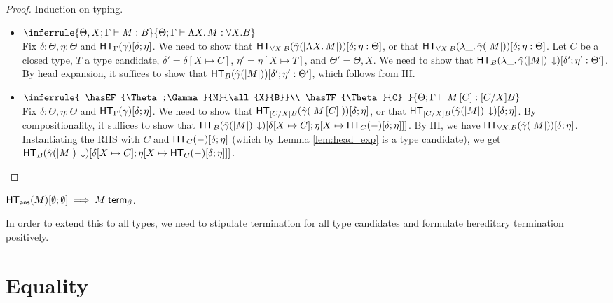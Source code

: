 \documentclass{article}
\begin{document}
\begin{proof}
Induction on typing.
\begin{itemize}
\setlength\itemsep{1em}
\item $\inferrule{
  \hasEF{\Theta, X; \Gamma}{M}{B}
  }{
  \hasEF{\Theta; \Gamma}{\tlam{X}{M}}{\all{X}{B}}
  }$\\
Fix $\delta : \Theta, \eta : \Theta$ and $\mathsf{HT}_{\Gamma}(\gamma)[\delta;\eta]$. We need to show that
$\mathsf{HT}_{\forall X. B}(\hat\gamma(|\Lambda X.\, M|))[\delta;\eta : \Theta]$, or that
$\mathsf{HT}_{\forall X. B}(\lambda \_.\, \hat\gamma(|M|))[\delta;\eta : \Theta]$.
Let $C$ be a closed type, $T$ a type candidate,
$\delta' = \delta[X \mapsto C]$, $\eta' = \eta[X \mapsto T]$, and $\Theta' = \Theta,X$.
We need to show that $\mathsf{HT}_{B}(\lambda \_.\, \hat\gamma(|M|)\,\downarrow)[\delta';\eta' : \Theta']$.
By head expansion, it suffices to show
that $\mathsf{HT}_{B}(\hat\gamma(|M|))[\delta';\eta' : \Theta']$, which follows from IH.

\item $\inferrule{
  \hasEF{\Theta;\Gamma}{M}{\all{X}{B}}\\
  \hasTF{\Theta}{C}
  }{
  \hasEF{\Theta;\Gamma}{\tap{M}{C}}{[C/X]B}
  }$\\
Fix $\delta : \Theta, \eta : \Theta$ and $\mathsf{HT}_{\Gamma}(\gamma)[\delta;\eta]$. We need to show that
$\mathsf{HT}_{[C/X]B}(\hat\gamma(|M\,[C]|))[\delta;\eta]$, or that
$\mathsf{HT}_{[C/X]B}(\hat\gamma(|M|)\,\downarrow)[\delta;\eta]$. By compositionality, it suffices to show that
$\mathsf{HT}_{B}(\hat\gamma(|M|)\,\downarrow)[\delta[X \mapsto C];\eta[X \mapsto \mathsf{HT}_{C}(-)[\delta;\eta]]]$.
By IH, we have $\mathsf{HT}_{\forall X. B}(\hat\gamma(|M|))[\delta;\eta]$. Instantiating the RHS with $C$ and
$\mathsf{HT}_{C}(-)[\delta;\eta]$ (which by Lemma \ref{lem:head_exp} is a type candidate), we get
$\mathsf{HT}_{B}(\hat\gamma(|M|)\,\downarrow)[\delta[X \mapsto C];\eta[X \mapsto \mathsf{HT}_{C}(-)[\delta;\eta]]]$.
\end{itemize}
\end{proof}

\begin{corollary}
$\mathsf{HT}_{\mathsf{ans}}(M)[\emptyset;\emptyset] \implies {M} \; \mathsf{term}_{\beta}$.
\end{corollary}

In order to extend this to all types, we need to stipulate termination for all type candidates and formulate hereditary
termination positively.

\section{Equality}
\end{document}
